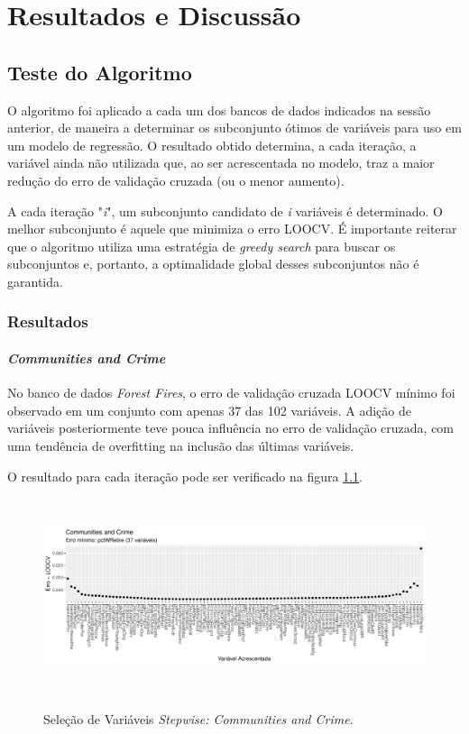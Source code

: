 \chapter[Resultados e Discussão]{Resultados e Discussão}

\section{Teste do Algoritmo}

O algoritmo foi aplicado a cada um dos bancos de dados indicados na sessão anterior, de maneira a determinar os subconjunto ótimos de variáveis para uso em um modelo de regressão. O resultado obtido determina, a cada iteração, a variável ainda não utilizada que, ao ser acrescentada no modelo, traz a maior redução do erro de validação cruzada (ou o menor aumento). 

A cada iteração "\textit{i}", um subconjunto candidato de \textit{i} variáveis é determinado. O melhor subconjunto é aquele que minimiza o erro LOOCV. É importante reiterar que o algoritmo utiliza uma estratégia de \textit{greedy search} para buscar os subconjuntos e, portanto, a optimalidade global desses subconjuntos não é garantida.

\subsection{Resultados}

\subsubsection{\textit{Communities and Crime}}

No banco de dados \textit{Forest Fires}, o erro de validação cruzada LOOCV mínimo foi observado em um conjunto com apenas 37 das 102 variáveis. A adição de variáveis posteriormente teve pouca influência no erro de validação cruzada, com uma tendência de overfitting na inclusão das últimas variáveis.

O resultado para cada iteração pode ser verificado na figura \ref{fig:stepwise_CommunitiesandCrime_validation}.

\begin{figure}[!htb]
    \centering
    \caption{Seleção de Variáveis \textit{Stepwise: Communities and Crime}.}
    \includegraphics[height=163pt]{imgs/res/CommunitiesandCrime_validation.pdf}
    \label{fig:stepwise_CommunitiesandCrime_validation}
\end{figure}

